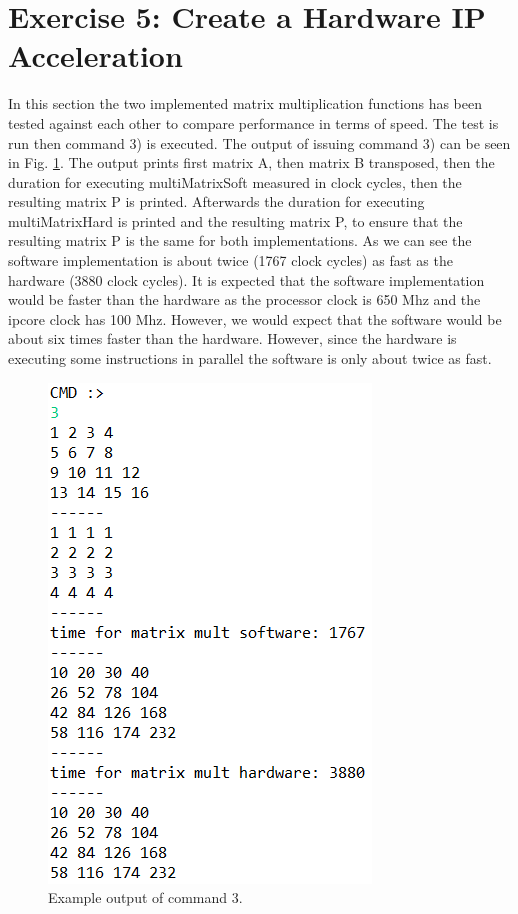 \documentclass[a4paper,12pt]{report}    %
\begin{document}
\section{Exercise 5: Create a Hardware IP Acceleration}
In this section the two implemented matrix multiplication functions has been tested against each other to compare performance in terms of speed. The test is run then command 3) is executed. The output of issuing command 3) can be seen in Fig. \ref{cmd3}. The output prints first matrix A, then matrix B transposed, then the duration for executing multiMatrixSoft measured in clock cycles, then the resulting matrix P is printed. Afterwards the duration for executing multiMatrixHard is printed and the resulting matrix P, to ensure that the resulting matrix P is the same for both implementations. As we can see the software implementation is about twice (1767 clock cycles) as fast as the hardware (3880 clock cycles). It is expected that the software implementation would be faster than the hardware as the processor clock is 650 Mhz and the ip\-core clock has 100 Mhz. However, we would expect that the software would be about six times faster than the hardware. However, since the hardware is executing some instructions in parallel the software is only about twice as fast.

\begin{figure}[h]
  \centering
  \includegraphics[scale = 1]{latex/figures/test3.PNG}
  \caption{Example output of command 3.}
  \label{cmd3}
\end{figure}
\end{document}
